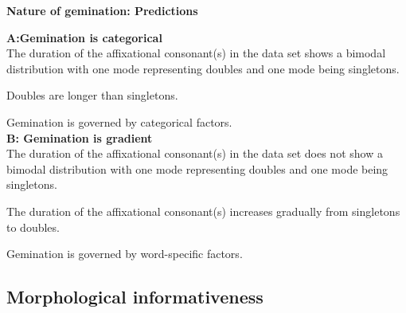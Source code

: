 {\noindent \textbf{Nature of gemination: Predictions}\\	\label{predictions nature of gemination}

\noindent \textbf{A:\hspace{0.5cm}Gemination is categorical} \\



\noindent	The duration of the affixational consonant(s) in the data set shows a bimodal distribution with one mode representing doubles and one mode being singletons.\vspace{0.3 cm}
	
\noindent	Doubles are longer than singletons. \vspace{0.3 cm}
	
\noindent	Gemination is governed by categorical factors.	\\



\noindent	\textbf{B: \hspace{0.5cm}Gemination is gradient} \\
		
\noindent	The duration of the affixational consonant(s) in the data set does not show a bimodal distribution with one mode representing doubles and one mode being singletons. \vspace{0.3 cm}

\noindent	The duration of the affixational consonant(s) increases gradually from singletons to doubles.  \vspace{0.3 cm}
	
\noindent	Gemination is governed by word-specific factors.
	



\subsection{Morphological informativeness} \label{morphological informativeness}

}
